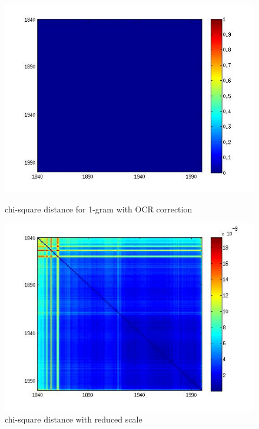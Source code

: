 \begin{figure}[H]
    \begin{minipage}[b]{0.48\linewidth}
        \includegraphics[scale=0.3]{Pictures/chi2/chi2_corrected2.jpg}
        \caption{chi-square distance for 1-gram with OCR correction}
        \label{chi2_1}
    \end{minipage}\hfill
    \begin{minipage}[b]{0.5\linewidth}
        \includegraphics[scale=0.3]{Pictures/chi2/chi2_corrected.jpg}
        \caption{chi-square distance with reduced scale}
        \label{chi2_2}
    \end{minipage}\hfill
\end{figure}
